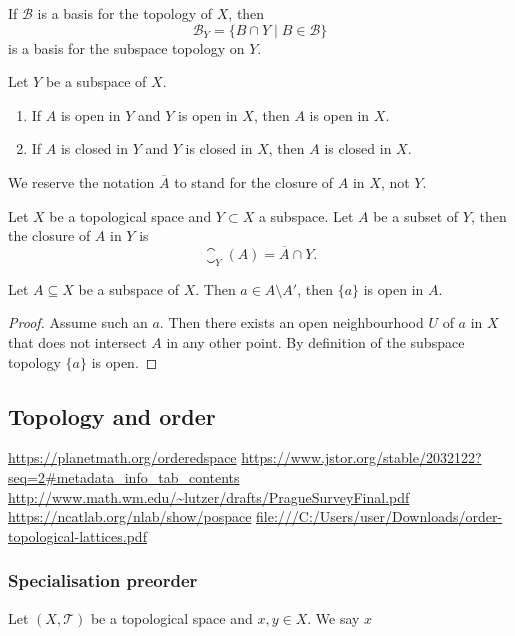 \begin{lemma}
If $\mathcal{B}$ is a basis for the topology of $X$, then
\[\mathcal{B}_Y = \{ B\cap Y \;|\; B\in \mathcal{B} \}\]
is a basis for the subspace topology on $Y$.
\end{lemma}

\begin{lemma}
Let $Y$ be a subspace of $X$.
\begin{enumerate}
\item If $A$ is open in $Y$ and $Y$ is open in $X$, then $A$ is open in $X$.
\item If $A$ is closed in $Y$ and $Y$ is closed in $X$, then $A$ is closed in $X$.
\end{enumerate}
\end{lemma}
 
We reserve the notation $\overline{A}$ to stand for the closure of $A$ in $X$, not $Y$.
\begin{lemma} \label{subspaceClosure}
Let $X$ be a topological space and $Y\subset X$ a subspace. Let $A$ be a subset of $Y$, then the closure of $A$ in $Y$ is
\[ \closure_Y(A) = \overline{A}\cap Y.  \]
\end{lemma}

\begin{lemma} \label{notLimitPointSingletonOpen}
Let $A\subseteq X$ be a subspace of $X$. Then $a\in A\setminus A'$, then $\{a\}$ is open in $A$.
\end{lemma}
\begin{proof}
Assume such an $a$. Then there exists an open neighbourhood $U$ of $a$ in $X$ that does not intersect $A$ in any other point. By definition of the subspace topology $\{a\}$ is open.
\end{proof}

\subsection{Topology and order}
\begin{definition}

\end{definition}

\url{https://planetmath.org/orderedspace}
\url{https://www.jstor.org/stable/2032122?seq=2#metadata_info_tab_contents}
\url{http://www.math.wm.edu/~lutzer/drafts/PragueSurveyFinal.pdf}
\url{https://ncatlab.org/nlab/show/pospace}
\url{file:///C:/Users/user/Downloads/order-topological-lattices.pdf}

\subsubsection{Specialisation preorder}
\begin{definition}
Let $(X,\mathcal{T})$ be a topological space and $x,y\in X$. We say $x$
\end{definition}

